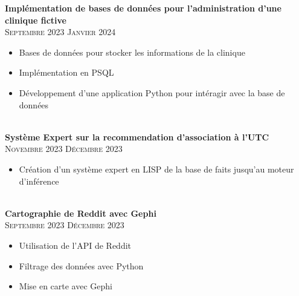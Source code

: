 \documentclass[oneside]{article}
\begin{document}
{\begin{minipage}[t][\dimexpr\textheight-2\fboxrule-2\fboxsep\relax][t]{\dimexpr0.6\textwidth-2\fboxrule-2\fboxsep\relax}
        \vspace{-\baselineskip}
        \vspace{0.3cm}

        {\large \textbf{Implémentation de bases de données pour l'administration d'une clinique fictive}} \\
        {\scshape{}\selectfont\footnotesize Septembre 2023 \textendash{} Janvier 2024} \\
        \vspace{-\baselineskip}
        \vspace{0.2cm}
        \begin{itemize}
            \setlength{\itemsep}{-5pt}
            \item Bases de données pour stocker les informations de la clinique
            \item Implémentation en PSQL
            \item Développement d'une application Python pour intéragir avec la base de données
        \end{itemize}\\

        {\large \textbf{Système Expert sur la recommendation d'association à l'UTC}} \\
        {\scshape{}\selectfont\footnotesize Novembre 2023 \textendash{} Décembre 2023} \\
        \vspace{-\baselineskip}
        \vspace{0.2cm}
        \begin{itemize}
            \setlength{\itemsep}{-5pt}
            \item Création d'un système expert en LISP de la base de faits jusqu'au moteur d'inférence
        \end{itemize}\\
        
        {\large \textbf{Cartographie de Reddit avec Gephi}} \\
        {\scshape{}\selectfont\footnotesize Septembre 2023 \textendash{} Décembre 2023} \\
        \vspace{-\baselineskip}
        \vspace{0.2cm}
        \begin{itemize}
            \setlength{\itemsep}{-5pt}
            \item Utilisation de l'API de Reddit
            \item Filtrage des données avec Python
            \item Mise en carte avec Gephi
        \end{itemize}\\


\end{minipage}}
\end{document}
